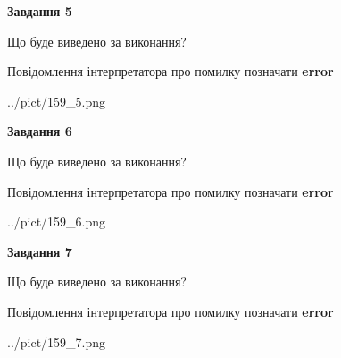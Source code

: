 \documentclass[10pt, ukrainian]{article}
\begin{document}
{\begin {large}
{\begin {center}\textbf{Завдання 5}\end {center}}\par
Що буде виведено за виконання? \par
Повідомлення інтерпретатора про помилку позначати \textbf{error}

\begin{center}
	{../pict/159_5.png}
\end{center}
\newpage

{\begin {center}\textbf{Завдання 6}\end {center}}\par
Що буде виведено за виконання? \par
Повідомлення інтерпретатора про помилку позначати \textbf{error}

\begin{center}
	{../pict/159_6.png}
\end{center}
\newpage

{\begin {center}\textbf{Завдання 7}\end {center}}\par
Що буде виведено за виконання? \par
Повідомлення інтерпретатора про помилку позначати \textbf{error}

\begin{center}
	{../pict/159_7.png}
\end{center}
\newpage

\end {large}}
\end{document}
